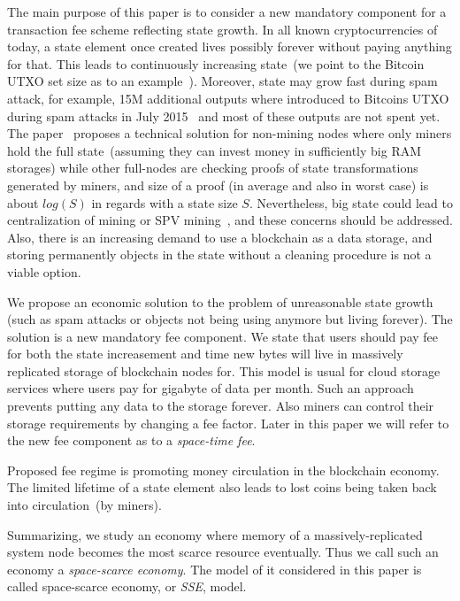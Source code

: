 \documentclass[]{llncs}   %
\newcommand{\esse}{\textit{SSE}}
\begin{document}
The main purpose of this paper is to consider a new mandatory component for a transaction fee scheme reflecting state growth. In all known cryptocurrencies of today, a state element once created lives possibly forever without paying anything for that. This leads to continuously increasing state~(we point to the Bitcoin UTXO set size as to an example~\cite{utxoChart}). Moreover, state may grow fast during spam attack, for example, 15M additional outputs where introduced to Bitcoins UTXO during spam attacks in July 2015~\cite{bitcoin2015flood} and most of these outputs are not spent yet. The paper~\cite{reyzin2016improving} proposes a technical solution for non-mining nodes where only miners hold the full state~(assuming they can invest money in sufficiently big RAM storages) while other full-nodes are checking proofs of state transformations generated by miners, and size of a proof (in average and also in worst case) is about $log(S)$ in regards with a state size $S$. Nevertheless, big state could lead to centralization of mining or SPV mining~\cite{spvMining}, and these concerns should be addressed.
Also, there is an increasing demand to use a blockchain as a data storage, and storing permanently objects in the state without a cleaning procedure is not a viable option.

We propose an economic solution to the problem of unreasonable state growth (such as spam attacks or objects not being using anymore but living forever). The solution is a new mandatory fee component. We state that users should pay fee for both the state increasement and time new bytes will live in massively replicated storage of blockchain nodes for. This model is usual for cloud storage services where users pay for gigabyte of data per month. Such an approach prevents putting any data to the storage forever. Also miners can control their storage requirements by changing a fee factor. Later in this paper we will refer to the new fee component as to a \textit{space-time fee}.

Proposed fee regime is promoting money circulation in the blockchain economy. The limited lifetime of a state element also leads to lost coins being taken back into circulation~(by miners). 

Summarizing, we study an economy where memory of a massively-replicated system node becomes the most scarce resource eventually. Thus we call such an economy a \textit{space-scarce economy}. The model of it considered in this paper is called space-scarce economy, or \esse{}, model.
\end{document}
